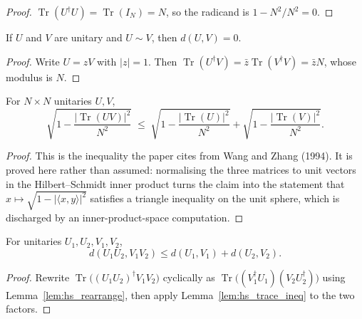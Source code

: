 \begin{proof}
  \leanok
  $\operatorname{Tr}(U^\dagger U) = \operatorname{Tr}(I_N) = N$, so the
  radicand is $1 - N^2/N^2 = 0$.
\end{proof}

\begin{lemma}
  \label{lem:hs_phase}
  \leanok
  If $U$ and $V$ are unitary and $U \sim V$, then $d(U,V) = 0$.
\end{lemma}

\begin{proof}
  \leanok
  Write $U = z V$ with $\lvert z \rvert = 1$.  Then
  $\operatorname{Tr}(U^\dagger V) = \bar{z}\operatorname{Tr}(V^\dagger V)
   = \bar{z} N$, whose modulus is $N$.
\end{proof}

\begin{lemma}
  \label{lem:hs_trace_ineq}
  \leanok
  For $N \times N$ unitaries $U, V$,
  \[
    \sqrt{1 - \frac{\lvert\operatorname{Tr}(UV)\rvert^2}{N^2}}
      \;\le\;
    \sqrt{1 - \frac{\lvert\operatorname{Tr}(U)\rvert^2}{N^2}}
      +
    \sqrt{1 - \frac{\lvert\operatorname{Tr}(V)\rvert^2}{N^2}}.
  \]
\end{lemma}

\begin{proof}
  \leanok
  This is the inequality the paper cites from Wang and Zhang (1994).  It is
  proved here rather than assumed: normalising the three matrices to unit
  vectors in the Hilbert--Schmidt inner product turns the claim into the
  statement that $x \mapsto \sqrt{1 - \lvert\langle x, y\rangle\rvert^2}$
  satisfies a triangle inequality on the unit sphere, which is discharged by
  an inner-product-space computation.
\end{proof}

\begin{lemma}
  \label{lem:hs_mul}
  \leanok
  For unitaries $U_1, U_2, V_1, V_2$,
  \[
    d(U_1 U_2, V_1 V_2) \le d(U_1, V_1) + d(U_2, V_2).
  \]
\end{lemma}

\begin{proof}
  \leanok
  Rewrite $\operatorname{Tr}\!\big((U_1U_2)^\dagger V_1 V_2\big)$ cyclically as
  $\operatorname{Tr}\!\big((V_1^\dagger U_1)(V_2 U_2^\dagger)\big)$ using
  Lemma~\ref{lem:hs_rearrange}, then apply
  Lemma~\ref{lem:hs_trace_ineq} to the two factors.
\end{proof}

